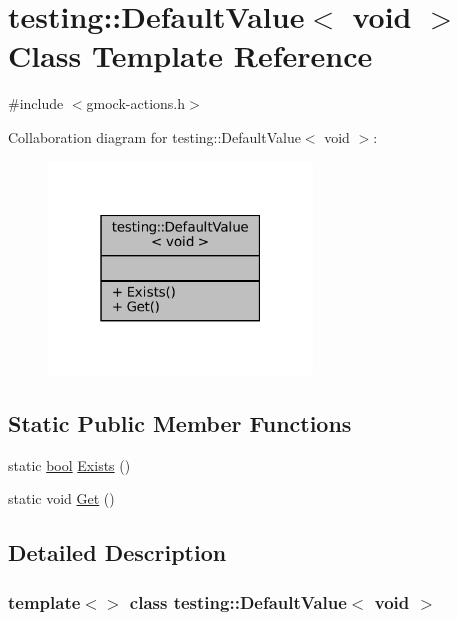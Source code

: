 \hypertarget{classtesting_1_1DefaultValue_3_01void_01_4}{}\section{testing\+:\+:Default\+Value$<$ void $>$ Class Template Reference}
\label{classtesting_1_1DefaultValue_3_01void_01_4}


{\ttfamily \#include $<$gmock-\/actions.\+h$>$}



Collaboration diagram for testing\+:\+:Default\+Value$<$ void $>$\+:
\nopagebreak
\begin{figure}[H]
\begin{center}
\leavevmode
\includegraphics[width=199pt]{classtesting_1_1DefaultValue_3_01void_01_4__coll__graph}
\end{center}
\end{figure}
\subsection*{Static Public Member Functions}
\begin{DoxyCompactItemize}
\item 
static \hyperlink{classbool}{bool} \hyperlink{classtesting_1_1DefaultValue_3_01void_01_4_ae18ea46cbf928b820c91f15fa7aa317b}{Exists} ()
\item 
static void \hyperlink{classtesting_1_1DefaultValue_3_01void_01_4_acda4c367a5b0c0cfb28bc2289f385eed}{Get} ()
\end{DoxyCompactItemize}


\subsection{Detailed Description}
\subsubsection*{template$<$$>$\newline
class testing\+::\+Default\+Value$<$ void $>$}



